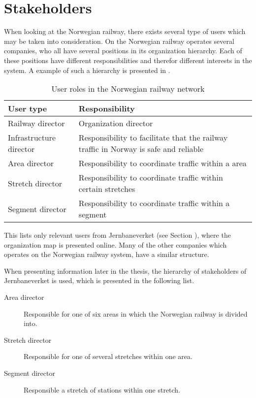
\clearpage
\section{Stakeholders} %
\label{sec:back_stakeholders}
When looking at the Norwegian railway, there exists several type of users which
may be taken into consideration. On the Norwegian railway operates several
companies, who all have several positions in its organization hierarchy. Each
of these positions have different responsibilities and therefor different
interests in the system. A example of such a hierarchy is presented in
.

\begin{table}[!h]\small
	\begin{tabularx}{\textwidth}{|l|X|}
		\hline
		User type & Responsibility \\
		\hline
		Railway director & Organization director\\
		\hline
		Infrastructure director & Responsibility to facilitate that the railway traffic in Norway is safe and reliable\\
		\hline
		Area director & Responsibility to coordinate traffic within a area\\
		\hline
		Stretch director & Responsibility to coordinate traffic within certain
		stretches\\
		\hline
		Segment director & Responsibility to coordinate traffic within a segment\\
		\hline
	\end{tabularx}
\caption{User roles in the Norwegian railway network}
\label{table:user_roles}
\end{table}

This lists only relevant users from Jernbaneverket (see Section
), where the organization map is presented
online\cite{jernbaneverketOrganisasjon}\cite{jernbaneverketInfrastruktdivisjon}.
Many of the other companies which operates on the Norwegian railway system,
have a similar structure. 

When presenting information later in the thesis, the hierarchy of stakeholders of Jernbaneverket is used, which is presented in the following list.
\begin{description}
	\item [Area director] Responsible for one of six areas in which the 
	Norwegian railway is divided into.
	\item [Stretch director] Responsible for one of several stretches within 
	one area.
	\item [Segment director] Responsible a stretch of stations within one stretch.
\end{description}

